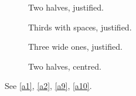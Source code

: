 \documentclass{article}
\begin{document}
\begin{figure}
\subfigure[One]{\rule{0.5\textwidth}{1cm}
\label{a1}}
\subfigure[Two]{\rule{0.5\textwidth}{1cm}
\label{a2}}
\caption{Two halves, justified.}\label{f1}
\end{figure}
\begin{figure}
\subfigure[Three]{
  \rule{0.32\linewidth}{1cm}
}
\subfigure[Four]{
  \rule{0.32\linewidth}{1cm}
}
\subfigure[Five]{
  \rule{0.32\linewidth}{1cm}
}
\caption{Thirds with spaces, justified.}\label{f2}
\end{figure}
\begin{figure}
\subfigure[Six]{\rule{0.6\textwidth}{1cm}}
\subfigure[Seven]{\rule{0.6\textwidth}{1cm}}
\subfigure[Eight]{\rule{0.6\textwidth}{1cm}}
\caption{Three wide ones, justified.}\label{f3}
\end{figure}
\begin{figure}
\centering
\subfigure[Nine]{\rule{0.5\textwidth}{1cm}
\label{a9}}
\subfigure[Ten]{\rule{0.5\textwidth}{1cm}
\label{a10}}
\caption{Two halves, centred.}\label{f4}
\end{figure}
See \ref{a1}, \ref{a2}, \ref{a9}, \ref{a10}.
\end{document}
